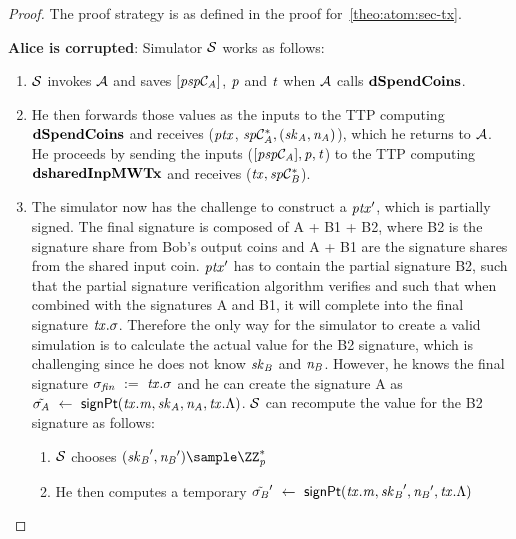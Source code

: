 \begin{proof}
    The proof strategy is as defined in the proof for~\cref{theo:atom:sec-tx}.

    \textbf{Alice is corrupted}: Simulator $\mathcal{S}$ works as follows:
    \begin{enumerate}
        \item $\mathcal{S}$ invokes $\mathcal{A}$ and saves $[\mathit{psp}\mathcal{C}_{\mathit{A}}]$, $\mathit{p}$ and $\mathit{t}$ when $\mathcal{A}$ calls $\mathbf{dSpendCoins}$.
        \item He then forwards those values as the inputs to the TTP computing $\mathbf{dSpendCoins}$ and receives ($\mathit{ptx}$, $\mathit{sp}\mathcal{C}_{\mathit{A}}^*, (\mathit{sk}_{\mathit{A}}, \mathit{\mathit{n}_{\mathit{A}}})$), which he returns to $\mathcal{A}$.
        He proceeds by sending the inputs ($[\mathit{psp}\mathcal{C}_{\mathit{A}}], \mathit{p}, \mathit{t}$) to the TTP computing $\mathbf{dsharedInpMWTx}$ and receives ($\mathit{tx}, \mathit{sp}\mathcal{C}_{\mathit{B}}^*$).
        \item The simulator now has the challenge to construct a ${\mathit{ptx}}'$, which is partially signed.
        The final signature is composed of A + B1 + B2, where B2 is the signature share from Bob's output coins and A + B1 are the signature shares from the shared input coin.
        ${\mathit{ptx}}'$ has to contain the partial signature B2, such that the partial signature verification algorithm verifies and such that when combined with the signatures A and B1, it will complete into the final signature $\mathit{tx}.\sigma$.
        Therefore the only way for the simulator to create a valid simulation is to calculate the actual value for the B2 signature, which is challenging since he does not know $\mathit{sk}_{\mathit{B}}$ and $\mathit{\mathit{n}_{\mathit{B}}}$.
        However, he knows the final signature $\sigma_{\mathit{fin}} ~:=~ \mathit{tx}.\sigma$ and he can create the signature A as $\tilde{\sigma_{\mathit{A}}} ~\leftarrow~ \mathsf{signPt}(\mathit{tx}.\mathit{m}, \mathit{sk}_{\mathit{A}}, \mathit{\mathit{n}_{\mathit{A}}}, \mathit{tx}.\Lambda)$.
        $\mathcal{S}$ can recompute the value for the B2 signature as follows:
        \begin{enumerate}
            \item $\mathcal{S}$ chooses $(\funStarAlt{\varSecKeyBob}, \funStarAlt{\varNonceBob}) \sample \cnstIntegersPrimeWithoutZero{\varPrime}$
            \item He then computes a temporary ${\tilde{\sigma_{\mathit{B}}}}' ~\leftarrow~ \mathsf{signPt}(\mathit{tx}.\mathit{m}, {\mathit{sk}_{\mathit{B}}}', {\mathit{\mathit{n}_{\mathit{B}}}}', \mathit{tx}.\Lambda)$

\end{enumerate}
\end{enumerate}
\end{proof}
